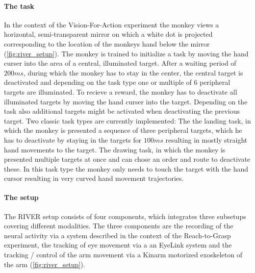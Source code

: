 \paragraph{The task}
In the context of the Vision-For-Action experiment the monkey views a horizontal, semi-transparent mirror on which a white dot is projected corresponding to the location of the monkeys hand below the mirror (\cref{fig:river_setup}). The monkey is trained to initialize a task by moving the hand curser into the area of a central, illuminated target. After a waiting period of $200ms$, during which the monkey has to stay in the center, the central target is deactivated and depending on the task type one or multiple of 6 peripheral targets are illuminated. To recieve a reward, the monkey has to deactivate all illuminated targets by moving the hand curser into the target. Depending on the task also additional targets might be activated when deactivating the previous target. Two classic task types are currently implemented: The the landing task, in which the monkey is presented a sequence of three peripheral targets, which he has to deactivate by staying in the targets for $100ms$ resulting in mostly straight hand movements to the target. The drawing task, in which the monkey is presented multiple targets at once and can chose an order and route to deactivate these. In this task type the monkey only needs to touch the target with the hand cursor resulting in very curved hand movement trajectories. 


\paragraph{The setup}
The RIVER setup consists of four components, which integrates three subsetups covering different modalities. The three components are the recording of the neural activity via a  system described in the context of the Reach-to-Grasp experiment, the tracking of eye movement via a an EyeLink system and the tracking / control of the arm movement via a Kinarm motorized exoskeleton of the arm (\cref{fig:river_setup}).

